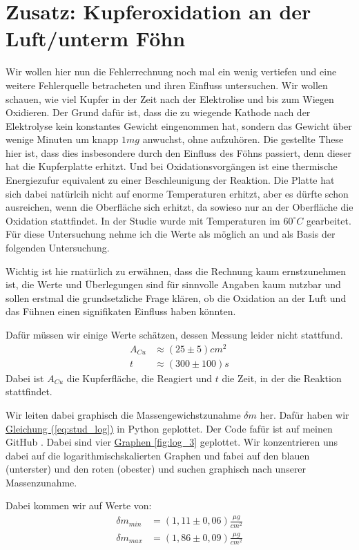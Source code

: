 \section{Zusatz: Kupferoxidation an der Luft/unterm Föhn}
Wir wollen hier nun die Fehlerrechnung noch mal ein wenig vertiefen und eine weitere Fehlerquelle betracheten und ihren Einfluss untersuchen. Wir wollen schauen, wie viel Kupfer in der Zeit nach der Elektrolise und bis zum Wiegen Oxidieren.
Der Grund dafür ist, dass die zu wiegende Kathode nach der Elektrolyse kein konstantes Gewicht eingenommen hat, sondern das Gewicht über wenige Minuten um knapp $1mg$ anwuchst, ohne aufzuhören.
Die gestellte These hier ist, dass dies insbesondere durch den Einfluss des Föhns passiert, denn dieser hat die Kupferplatte erhitzt. Und bei Oxidationsvorgängen ist eine thermische Energiezufur equivalent zu einer Beschleunigung der Reaktion.
Die Platte hat sich dabei natürlcih nicht auf enorme Temperaturen erhitzt, aber es dürfte schon ausreichen, wenn die Oberfläche sich erhitzt, da sowieso nur an der Oberfläche die Oxidation stattfindet. In der Studie \cite{KupferStudie}
wurde mit Temperaturen im $60^\circ C$ gearbeitet. Für diese Untersuchung nehme ich die Werte als möglich an und als Basis der folgenden Untersuchung.

Wichtig ist hie rnatürlich zu erwähnen, dass die Rechnung kaum ernstzunehmen ist, die Werte und Überlegungen sind für sinnvolle Angaben kaum nutzbar und sollen erstmal die grundsetzliche Frage klären, ob die Oxidation an der Luft und das Fühnen einen signifikaten Einfluss haben könnten.

Dafür müssen wir einige Werte schätzen, dessen Messung leider nicht stattfund.
\begin{align}
    A_{Cu} &\approx (25 \pm 5)cm^2 \\
    t &\approx (300\pm100)s
\end{align}
Dabei ist $A_{Cu}$ die Kupferfläche, die Reagiert und $t$ die Zeit, in der die Reaktion stattfindet.

Wir leiten dabei graphisch die Massengewichstzunahme $\delta m$ her. Dafür haben wir \hyperref[eq:stud_log]{Gleichung (\ref*{eq:stud_log})} in Python geplottet. Der Code fafür ist auf meinen GitHub \cite{githubPAP1}. 
Dabei sind vier \hyperref[fig:log_3]{Graphen \ref*{fig:log_3}} geplottet. Wir konzentrieren uns dabei auf die logarithmischskalierten Graphen und fabei auf den blauen (unterster) und den roten (obester) und suchen graphisch nach unserer Massenzunahme. 

Dabei kommen wir auf Werte von:
\begin{align}
    \delta m_{min} &= (1,11 \pm 0,06)\frac{\mu g}{cm^2} \\
    \delta m_{max} &= (1,86 \pm 0,09)\frac{\mu g}{cm^2}
\end{align}

